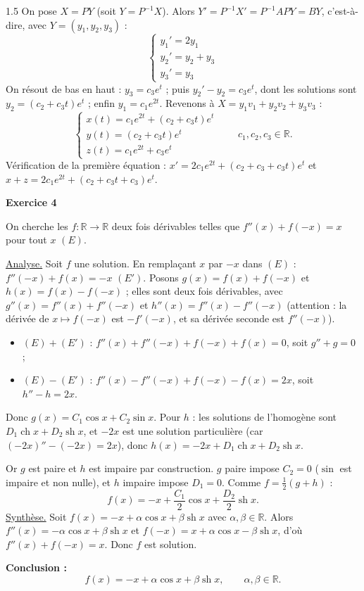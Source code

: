 \documentclass[12pt]{article}
\begin{document}
\begin{spacing}{1.5}
On pose $X=PY$ (soit $Y=P^{-1}X$). Alors $Y'=P^{-1}X'=P^{-1}APY=BY$, c'est-à-dire, avec $Y=(y_1,y_2,y_3)$ :
\[
\begin{cases}y_1'=2y_1\\y_2'=y_2+y_3\\y_3'=y_3\end{cases}
\]
On résout de bas en haut : $y_3=c_3e^t$ ; puis $y_2'-y_2=c_3e^t$, dont les solutions sont $y_2=(c_2+c_3t)e^t$ ; enfin $y_1=c_1e^{2t}$. Revenons à $X=y_1v_1+y_2v_2+y_3v_3$ :
\[
\boxed{\begin{cases}
x(t)=c_1e^{2t}+(c_2+c_3t)e^t\\
y(t)=(c_2+c_3t)e^t\\
z(t)=c_1e^{2t}+c_3e^t
\end{cases}\qquad c_1,c_2,c_3\in\mathbb{R}.}
\]
Vérification de la première équation : $x'=2c_1e^{2t}+(c_2+c_3+c_3t)e^t$ et $x+z=2c_1e^{2t}+(c_2+c_3t+c_3)e^t$.


\medskip\textbf{Exercice 4}

On cherche les $f:\mathbb{R}\to\mathbb{R}$ deux fois dérivables telles que $f''(x)+f(-x)=x$ pour tout $x$ $(E)$.

\underline{Analyse.} Soit $f$ une solution. En remplaçant $x$ par $-x$ dans $(E)$ : $f''(-x)+f(x)=-x$ $(E')$. Posons $g(x)=f(x)+f(-x)$ et $h(x)=f(x)-f(-x)$ ; elles sont deux fois dérivables, avec $g''(x)=f''(x)+f''(-x)$ et $h''(x)=f''(x)-f''(-x)$ (attention : la dérivée de $x\mapsto f(-x)$ est $-f'(-x)$, et sa dérivée seconde est $f''(-x)$).
\begin{itemize}
\item $(E)+(E')$ : $f''(x)+f''(-x)+f(-x)+f(x)=0$, soit $g''+g=0$ ;
\item $(E)-(E')$ : $f''(x)-f''(-x)+f(-x)-f(x)=2x$, soit $h''-h=2x$.
\end{itemize}
Donc $g(x)=C_1\cos x+C_2\sin x$. Pour $h$ : les solutions de l'homogène sont $D_1\operatorname{ch}x+D_2\operatorname{sh}x$, et $-2x$ est une solution particulière (car $(-2x)''-(-2x)=2x$), donc $h(x)=-2x+D_1\operatorname{ch}x+D_2\operatorname{sh}x$.

Or $g$ est paire et $h$ est impaire par construction. $g$ paire impose $C_2=0$ ($\sin$ est impaire et non nulle), et $h$ impaire impose $D_1=0$. Comme $f=\frac12(g+h)$ :
\[
f(x)=-x+\frac{C_1}{2}\cos x+\frac{D_2}{2}\operatorname{sh}x .
\]
\underline{Synthèse.} Soit $f(x)=-x+\alpha\cos x+\beta\operatorname{sh}x$ avec $\alpha,\beta\in\mathbb{R}$. Alors $f''(x)=-\alpha\cos x+\beta\operatorname{sh}x$ et $f(-x)=x+\alpha\cos x-\beta\operatorname{sh}x$, d'où $f''(x)+f(-x)=x$. Donc $f$ est solution.

\textbf{Conclusion :}
\[
\boxed{f(x)=-x+\alpha\cos x+\beta\operatorname{sh}x,\qquad\alpha,\beta\in\mathbb{R}}.
\]

\end{spacing}
\end{document}
